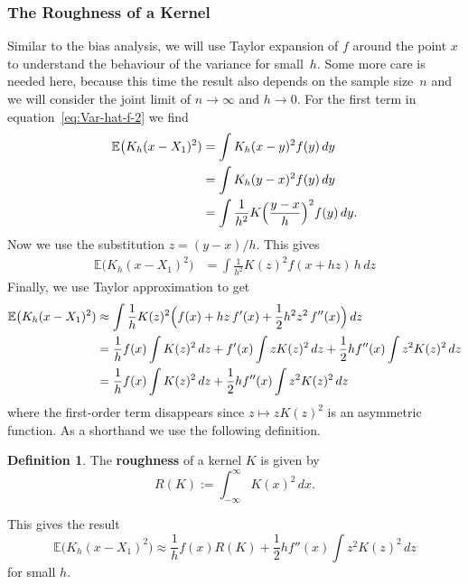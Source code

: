 \documentclass[
  a4paper,
]{article}
\theoremstyle{definition}
\newtheorem{definition}{Definition}[section]
\theoremstyle{definition}
\theoremstyle{definition}
\theoremstyle{definition}
\theoremstyle{remark}
\begin{document}
\subsubsection{The Roughness of a Kernel}\label{the-roughness-of-a-kernel}

Similar to the bias analysis, we will use Taylor expansion of \(f\) around
the point \(x\) to understand the behaviour of the variance for small~\(h\). Some more care is needed here, because this time the
result also depends on the sample size~\(n\) and we will consider the joint
limit of \(n \to \infty\) and \(h\to 0\). For the first term in
equation~\eqref{eq:Var-hat-f-2} we find
\begin{align*}
  \mathbb{E}\bigl( K_h(x - X_1)^2 )
  &= \int K_h(x - y)^2 f(y) \,dy \\
  &= \int K_h(y - x)^2 f(y) \,dy \\
  &= \int \frac{1}{h^2} K\Bigl( \frac{y - x}{h} \Bigr)^2 f(y) \,dy.
\end{align*}
Now we use the substitution \(z = (y - x) / h\). This gives
\begin{align*}
  \mathbb{E}\bigl( K_h(x - X_1)^2 )
  &= \int \frac{1}{h^2} K(z)^2 f(x + hz) \,h \,dz
\end{align*}
Finally, we use Taylor approximation to get
\begin{align*}
  \mathbb{E}\bigl( K_h(x - X_1)^2 )
  &\approx \int \frac{1}{h} K(z)^2 \Bigl( f(x) + hz\,f'(x) + \frac12 h^2 z^2 \,f''(x) \Bigr) \,dz \\
  &= \frac{1}{h} f(x) \int K(z)^2 \,dz
      + f'(x) \int z K(z)^2 \,dz
      + \frac12 h f''(x) \int z^2 K(z)^2 \,dz \\
  &= \frac{1}{h} f(x) \int K(z)^2 \,dz
      + \frac12 h f''(x) \int z^2 K(z)^2 \,dz
\end{align*}
where the first-order term disappears since \(z \mapsto z K(z)^2\) is an
asymmetric function. As a shorthand we use the following definition.

\begin{definition}
The \textbf{roughness} of a kernel \(K\) is given by
\begin{equation*}
  R(K)
  := \int_{-\infty}^\infty K(x)^2 \,dx.
\end{equation*}
\end{definition}

This gives the result
\begin{equation}
  \mathbb{E}\bigl( K_h(x - X_1)^2 \bigr)
  \approx \frac{1}{h} f(x) R(K) + \frac12 h f''(x) \int z^2 K(z)^2 \,dz
                             \label{eq:Var-frag1}
\end{equation}
for small \(h\).
\end{document}

